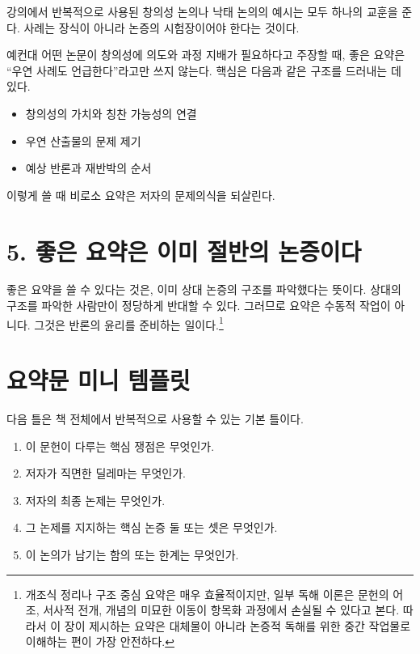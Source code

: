 강의에서 반복적으로 사용된 창의성 논의나 낙태 논의의 예시는 모두 하나의 교훈을 준다. 사례는 장식이 아니라 논증의 시험장이어야 한다는 것이다.

예컨대 어떤 논문이 창의성에 의도와 과정 지배가 필요하다고 주장할 때, 좋은 요약은 ``우연 사례도 언급한다''라고만 쓰지 않는다. 핵심은 다음과 같은 구조를 드러내는 데 있다.

\begin{itemize}
\tightlist
\item
  창의성의 가치와 칭찬 가능성의 연결
\item
  우연 산출물의 문제 제기
\item
  예상 반론과 재반박의 순서
\end{itemize}

이렇게 쓸 때 비로소 요약은 저자의 문제의식을 되살린다.

\section{5. 좋은 요약은 이미 절반의 논증이다}\label{5-uxc88buxc740-uxc694uxc57duxc740-uxc774uxbbf8-uxc808uxbc18uxc758-uxb17cuxc99duxc774uxb2e4}

좋은 요약을 쓸 수 있다는 것은, 이미 상대 논증의 구조를 파악했다는 뜻이다. 상대의 구조를 파악한 사람만이 정당하게 반대할 수 있다. 그러므로 요약은 수동적 작업이 아니다. 그것은 반론의 윤리를 준비하는 일이다.\footnote{개조식 정리나 구조 중심 요약은 매우 효율적이지만, 일부 독해 이론은 문헌의 어조, 서사적 전개, 개념의 미묘한 이동이 항목화 과정에서 손실될 수 있다고 본다. 따라서 이 장이 제시하는 요약은 대체물이 아니라 논증적 독해를 위한 중간 작업물로 이해하는 편이 가장 안전하다.}

\section{요약문 미니 템플릿}\label{uxc694uxc57duxbb38-uxbbf8uxb2c8-uxd15cuxd50cuxb9bf}

다음 틀은 책 전체에서 반복적으로 사용할 수 있는 기본 틀이다.

\begin{enumerate}
\def\labelenumi{\arabic{enumi}.}
\tightlist
\item
  이 문헌이 다루는 핵심 쟁점은 무엇인가.
\item
  저자가 직면한 딜레마는 무엇인가.
\item
  저자의 최종 논제는 무엇인가.
\item
  그 논제를 지지하는 핵심 논증 둘 또는 셋은 무엇인가.
\item
  이 논의가 남기는 함의 또는 한계는 무엇인가.
\end{enumerate}

